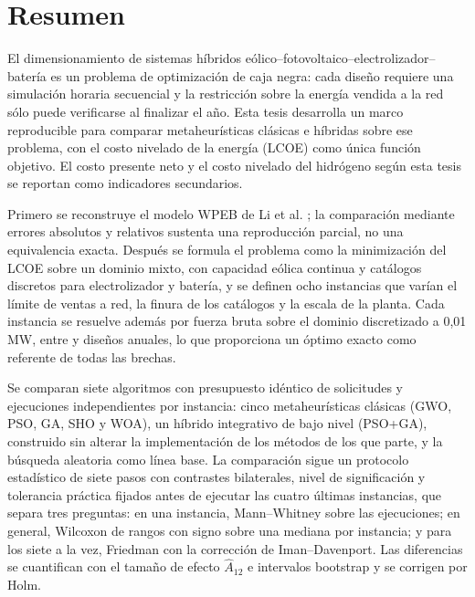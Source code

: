 \chapter*{Resumen}
\noindent

El dimensionamiento de sistemas híbridos eólico--fotovoltaico--electrolizador--batería es un problema de optimización de caja negra: cada diseño requiere una simulación horaria secuencial y la restricción sobre la energía vendida a la red sólo puede verificarse al finalizar el año. Esta tesis desarrolla un marco reproducible para comparar metaheurísticas clásicas e híbridas sobre ese problema, con el costo nivelado de la energía (LCOE) como única función objetivo. El costo presente neto y el costo nivelado del hidrógeno según esta tesis se reportan como indicadores secundarios.

Primero se reconstruye el modelo WPEB de Li et al. \cite{Li2024WPEB}; la comparación mediante errores absolutos y relativos sustenta una reproducción parcial, no una equivalencia exacta. Después se formula el problema como la minimización del LCOE sobre un dominio mixto, con capacidad eólica continua y catálogos discretos para electrolizador y batería, y se definen ocho instancias que varían el límite de ventas a red, la finura de los catálogos y la escala de la planta. Cada instancia se resuelve además por fuerza bruta sobre el dominio discretizado a 0,01 MW, entre \BFEDesigns{} y \BFCDesigns{} diseños anuales, lo que proporciona un óptimo exacto como referente de todas las brechas.

Se comparan siete algoritmos con presupuesto idéntico de \RequestsPerRun{} solicitudes y \Replicates{} ejecuciones independientes por instancia: cinco metaheurísticas clásicas (GWO, PSO, GA, SHO y WOA), un híbrido integrativo de bajo nivel (PSO+GA), construido sin alterar la implementación de los métodos de los que parte, y la búsqueda aleatoria como línea base. La comparación sigue un protocolo estadístico de siete pasos con contrastes bilaterales, nivel de significación y tolerancia práctica fijados antes de ejecutar las cuatro últimas instancias, que separa tres preguntas: en una instancia, Mann--Whitney sobre las ejecuciones; en general, Wilcoxon de rangos con signo sobre una mediana por instancia; y para los siete a la vez, Friedman con la corrección de Iman--Davenport. Las diferencias se cuantifican con el tamaño de efecto $\hat{A}_{12}$ e intervalos bootstrap y se corrigen por Holm.

